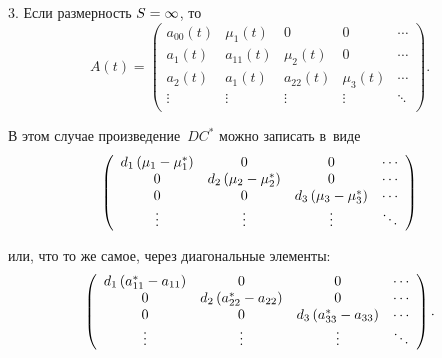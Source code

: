 \begin{multicols}{2}
\smallskip

3. Если размерность $S\hm=\infty$, то
\begin{equation*}
A\left( t\right) =  \left(
\begin{array}{ccccccc}
a_{00}(t)  & \mu_1(t)   & 0          & 0          &\cdots   \\
a_1(t)     & a_{11}(t)  & \mu_2(t)   & 0          &\cdots   \\
a_2(t)     & a_1(t)     & a_{22}(t)  & \mu_3(t)   & \cdots  \\
\vdots     & \vdots     & \vdots     & \vdots     & \ddots  \\
\end{array}
\right).
\end{equation*}

\noindent 
В этом случае произведение~$DC^*$ можно записать в~виде
\begin{equation*}
{%
\left(
\begin{array}{cccc}
d_1\left( \mu_1-\mu_1^*\right)                                & 0                                               
& 0                                       & \cdots \\
0                                                                  & 
d_2\left( \mu_2-\mu_2^*\right)             & 0                                       
& \cdots \\
0                                                                  & 0                                               
& d_3\left( \mu_3-\mu_3^*\right)     & \cdots \\
\vdots                                                             & \vdots                                          
& \vdots                                  & \ddots
 \end{array}
\right)}
\end{equation*}

\vspace*{2pt}

\noindent 
или, что то же самое, через диагональные элементы:
\begin{equation*}
{ %
\left(
\begin{array}{cccc}
d_1\left( a_{11}^*- a_{11}\right)                             & 0                                               
& 0                                           & \cdots \\
0                                                                  & 
d_2\left( a_{22}^*- a_{22}\right)          & 0                                           
& \cdots \\
0                                                                  & 0                                               
& d_3\left( a_{33}^*- a_{33}\right)      & \cdots \\
\vdots                                                             & \vdots                                          
& \vdots                                      & \ddots
 \end{array}
\right).}
\end{equation*}


\end{multicols}
